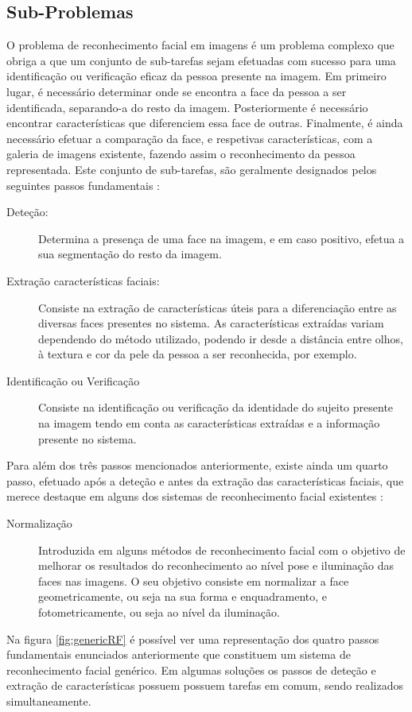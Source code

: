 \subsection{Sub-Problemas} \label{sec:sub-problemas}
O problema de reconhecimento facial em imagens é um problema complexo que obriga a que um conjunto de sub-tarefas sejam efetuadas com sucesso para uma identificação ou verificação eficaz da pessoa presente na imagem. Em primeiro lugar, é necessário determinar onde se encontra a face da pessoa a ser identificada, separando-a do resto da imagem. Posteriormente é necessário encontrar características que diferenciem essa face de outras. Finalmente, é ainda necessário efetuar a comparação da face, e respetivas características, com a galeria de imagens existente, fazendo assim o reconhecimento da pessoa representada. Este conjunto de sub-tarefas, são geralmente designados pelos seguintes passos fundamentais \citep{Zhao2003}:
\begin{description}
\item[Deteção:]
Determina a presença de uma face na imagem, e em caso positivo, efetua a sua segmentação do resto da imagem.

\item[Extração características faciais:]
Consiste na extração de características úteis para a diferenciação entre as diversas faces presentes no sistema. As características extraídas variam dependendo do método utilizado, podendo ir desde a distância entre olhos, à textura e cor da pele da pessoa a ser reconhecida, por exemplo. 

\item[Identificação ou Verificação]
Consiste na identificação ou verificação da identidade do sujeito presente na imagem tendo em conta as características extraídas e a informação presente no sistema.
\end{description}

Para além dos três passos mencionados anteriormente, existe ainda um quarto passo, efetuado após a deteção e antes da extração das características faciais, que merece destaque em alguns dos sistemas de reconhecimento facial existentes \citep{Li2011}:
\begin{description}
\item[Normalização]
Introduzida em alguns métodos de reconhecimento facial com o objetivo de melhorar os resultados do reconhecimento ao nível pose e iluminação das faces nas imagens. O seu objetivo consiste em normalizar a face geometricamente, ou seja na sua forma e enquadramento, e fotometricamente, ou seja ao nível da iluminação.
\end{description}
Na figura \ref{fig:genericRF} é possível ver uma representação dos quatro passos fundamentais enunciados anteriormente que constituem um sistema de reconhecimento facial genérico. Em algumas soluções os passos de deteção e extração de características possuem possuem tarefas em comum, sendo realizados simultaneamente.

